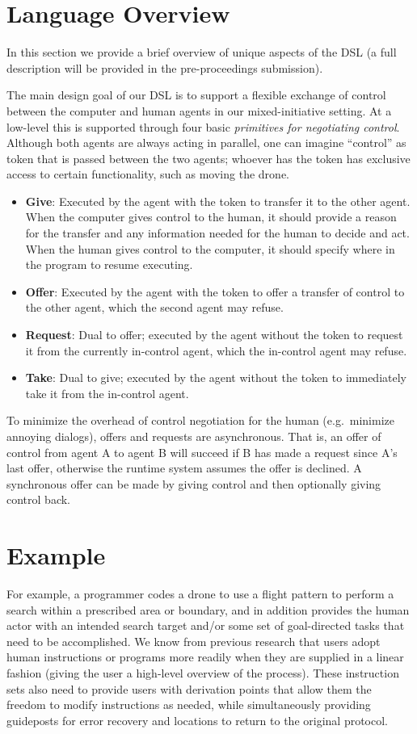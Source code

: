 \documentclass{sig-alternate-05-2015}
\begin{document}
\section{Language Overview}
\label{sec:lang}

In this section we provide a brief overview of unique aspects of the DSL (a
full description will be provided in the pre-proceedings submission).

The main design goal of our DSL is to support a flexible exchange of control
between the computer and human agents in our mixed-initiative setting. At a
low-level this is supported through four basic \emph{primitives for negotiating
control}. Although both agents are always acting in parallel, one can imagine
``control'' as token that is passed between the two agents; whoever has the
token has exclusive access to certain functionality, such as moving the drone.
%
\begin{itemize}
%
\item \textbf{Give}: Executed by the agent with the token to transfer it to the
other agent. When the computer gives control to the human, it should provide a
reason for the transfer and any information needed for the human to decide and
act. When the human gives control to the computer, it should specify where in
the program to resume executing.
%
\item \textbf{Offer}: Executed by the agent with the token to offer a transfer
of control to the other agent, which the second agent may refuse.
%
\item \textbf{Request}: Dual to offer; executed by the agent without the token
to request it from the currently in-control agent, which the in-control agent
may refuse.
%
\item \textbf{Take}: Dual to give; executed by the agent without the token to
immediately take it from the in-control agent.
%
\end{itemize}
%
To minimize the overhead of control negotiation for the human (e.g.\ minimize
annoying dialogs), offers and requests are asynchronous. That is, an offer of
control from agent A to agent B will succeed if B has made a request since A's
last offer, otherwise the runtime system assumes the offer is declined.
%
A synchronous offer can be made by giving control and then optionally giving
control back.

\section{Example}
\label{sec:example}
For example, a programmer codes a drone to use a flight pattern to perform
a search within a prescribed area or boundary, and in addition provides the
human actor with an intended search target and/or some set of goal-directed
tasks that need to be accomplished. We know from previous research
\cite{ABW15prog} that users adopt human instructions or programs more
readily when they are supplied in a linear fashion (giving the user a
high-level overview of the process). These instruction sets also need to
provide users with derivation points that allow them the freedom to modify
instructions as needed, while simultaneously providing guideposts for error
recovery and locations to return to the original protocol.
\end{document}
